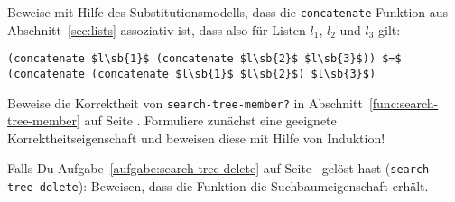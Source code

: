 \begin{aufgabe}
 Beweise mit Hilfe des Substitutionsmodells, dass
  die \lstinline{concatenate}-Funktion aus Abschnitt~\ref{sec:lists}
  assoziativ ist, dass also für Listen $l_1$, $l_2$ und $l_3$ gilt:
\begin{lstlisting}
(concatenate $l\sb{1}$ (concatenate $l\sb{2}$ $l\sb{3}$)) $=$ (concatenate (concatenate $l\sb{1}$ $l\sb{2}$) $l\sb{3}$)
\end{lstlisting}

  \begin{aufgabe}
    Beweise die Korrektheit von \texttt{search-tree-member?} in
    Abschnitt~\ref{func:search-tree-member} auf Seite
    \pageref{func:search-tree-member}.  Formuliere zunächst eine
    geeignete Korrektheitseigenschaft und beweisen diese mit Hilfe
    von Induktion!
\end{aufgabe}

\begin{aufgabe}
  Falls Du Aufgabe~\ref{aufgabe:search-tree-delete} auf
  Seite~\pageref{aufgabe:search-tree-delete} gelöst hast
  (\lstinline{search-tree-delete}): Beweisen, dass die Funktion die
  Suchbaumeigenschaft erhält.
\end{aufgabe}
\end{aufgabe}



